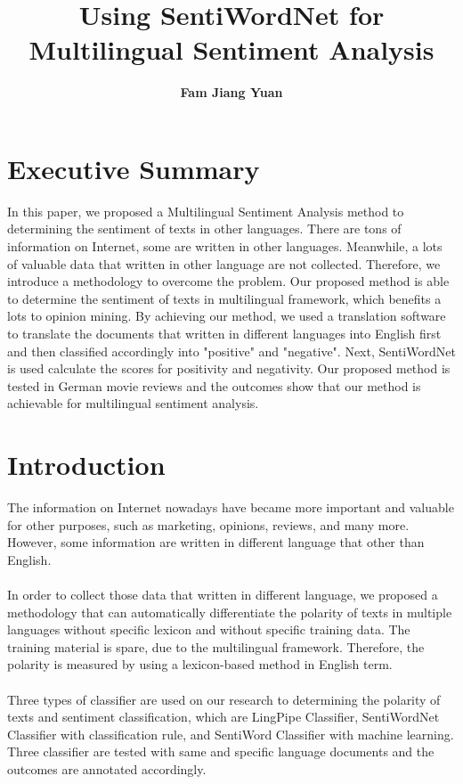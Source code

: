 \documentclass[a4papaer.12pt]{article}
\begin{document}


\title{\textbf{Using SentiWordNet for Multilingual Sentiment Analysis}}
\author{\textbf{Fam Jiang Yuan}}
\date{}
\maketitle

\section*{\textbf{Executive Summary}}
In this paper, we proposed a Multilingual Sentiment Analysis method to determining the sentiment of texts in other languages. There are tons of information on Internet, some are written in other languages. Meanwhile, a lots of valuable data that written in other language are not collected. Therefore, we introduce a methodology to overcome the problem. Our proposed method is able to determine the sentiment of texts in multilingual framework, which benefits a lots to opinion mining. By achieving our method, we used a translation software to translate the documents that written in different languages into English first and then classified accordingly into "positive" and "negative". Next, SentiWordNet is used calculate the scores for positivity and negativity. Our proposed method is tested in German movie reviews and the outcomes show that our method is achievable for multilingual sentiment analysis.
 
\section*{\textbf{Introduction}}
The information on Internet nowadays have became more important and valuable for other purposes, such as marketing, opinions, reviews, and many more. However, some information are written in different language that other than English. 
\\
\\
In order to collect those data that written in different language, we proposed a methodology that can automatically differentiate the polarity of texts in multiple languages without specific lexicon and without specific training data. The training material is spare, due to the multilingual framework. Therefore, the polarity is measured by using a lexicon-based method in English term.
\\
\\  
Three types of classifier are used on our research to determining the polarity of texts and sentiment classification, which are LingPipe Classifier, SentiWordNet Classifier with classification rule, and SentiWord Classifier with machine learning. Three classifier are tested with same and specific language documents and the outcomes are annotated accordingly. 
\end{document}
